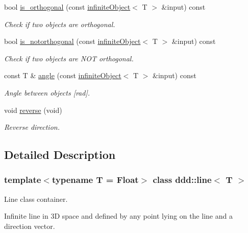 \begin{DoxyCompactItemize}
bool \hyperlink{classddd_1_1infinite_object_a634f0db3a5447756901c43f8f3d20a8a}{is\+\_\+orthogonal} (const \hyperlink{classddd_1_1infinite_object}{infinite\+Object}$<$ T $>$ \&input) const
\begin{DoxyCompactList}\small\item\em Check if two objects are orthogonal. \end{DoxyCompactList}\item 
bool \hyperlink{classddd_1_1infinite_object_a1dbf3e37dc6f146f089c4c63c4704329}{is\+\_\+notorthogonal} (const \hyperlink{classddd_1_1infinite_object}{infinite\+Object}$<$ T $>$ \&input) const
\begin{DoxyCompactList}\small\item\em Check if two objects are N\+OT orthogonal. \end{DoxyCompactList}\item 
const T \& \hyperlink{classddd_1_1infinite_object_a2145eca21c4505c11d19badc25faaf85}{angle} (const \hyperlink{classddd_1_1infinite_object}{infinite\+Object}$<$ T $>$ \&input) const
\begin{DoxyCompactList}\small\item\em Angle between objects \mbox{[}rad\mbox{]}. \end{DoxyCompactList}\item 
\mbox{\label{classddd_1_1infinite_object_ae9f9826fd760a02b74604e63434b4211}} 
void \hyperlink{classddd_1_1infinite_object_ae9f9826fd760a02b74604e63434b4211}{reverse} (void)
\begin{DoxyCompactList}\small\item\em Reverse direction. \end{DoxyCompactList}\end{DoxyCompactItemize}


\subsection{Detailed Description}
\subsubsection*{template$<$typename T = Float$>$\newline
class ddd\+::line$<$ T $>$}

Line class container. 

Infinite line in 3D space and defined by any point lying on the line and a direction vector. 

